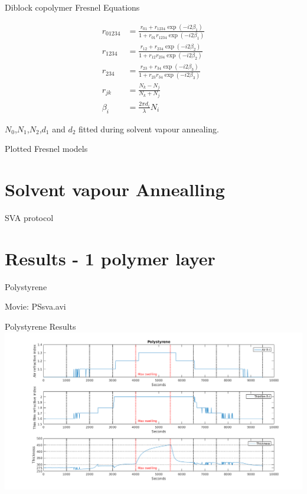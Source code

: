 \documentclass[10pt]{beamer}
\begin{document}
\begin{frame}{Diblock copolymer Fresnel Equations}

\begin{align*}
r_{01234}&= \frac{r_{01}+r_{1234}\exp(-i2\beta_1)}{1+r_{01}r_{1234}\exp(-i2\beta_1)} \\
r_{1234} &= \frac{r_{12}+r_{234}\exp(-i2\beta_2)}{1+r_{12}r_{234}\exp(-i2\beta_2)} \\
r_{234}  &= \frac{r_{23}+r_{34}\exp(-i2\beta_3)}{1+r_{23}r_{34}\exp(-i2\beta_3)} \\
r_{jk}   &= \frac{N_k-N_j}{N_k + N_j}\\  
\beta_i  &= \frac{2\pi d_i}{\lambda}N_i
\end{align*}

$N_0$,$N_1$,$N_2$,$d_1$ and $d_2$ fitted during solvent vapour annealing.
\end{frame}

\begin{frame}{Plotted Fresnel models}

\end{frame}	

	\section{Solvent vapour Annealling}
\begin{frame}{SVA protocol}

\end{frame}


	\section{Results - 1 polymer layer}

\begin{frame}{Polystyrene}
\begin{center}
\Huge Movie: PSsva.avi
\end{center}
\end{frame}

\begin{frame}{Polystyrene Results}
\includegraphics[width=\textwidth]{PSswelling1.png}
\end{frame}
\end{document}

